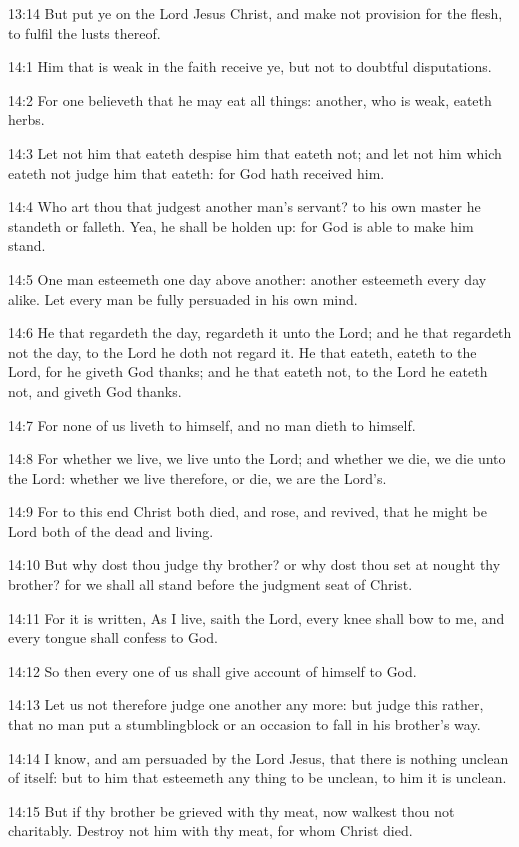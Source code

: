 13:14 But put ye on the Lord Jesus Christ, and make not provision for
the flesh, to fulfil the lusts thereof.

14:1 Him that is weak in the faith receive ye, but not to doubtful
disputations.

14:2 For one believeth that he may eat all things: another, who is
weak, eateth herbs.

14:3 Let not him that eateth despise him that eateth not; and let not
him which eateth not judge him that eateth: for God hath received him.

14:4 Who art thou that judgest another man's servant? to his own
master he standeth or falleth. Yea, he shall be holden up: for God is
able to make him stand.

14:5 One man esteemeth one day above another: another esteemeth every
day alike. Let every man be fully persuaded in his own mind.

14:6 He that regardeth the day, regardeth it unto the Lord; and he
that regardeth not the day, to the Lord he doth not regard it. He that
eateth, eateth to the Lord, for he giveth God thanks; and he that
eateth not, to the Lord he eateth not, and giveth God thanks.

14:7 For none of us liveth to himself, and no man dieth to himself.

14:8 For whether we live, we live unto the Lord; and whether we die,
we die unto the Lord: whether we live therefore, or die, we are the
Lord's.

14:9 For to this end Christ both died, and rose, and revived, that he
might be Lord both of the dead and living.

14:10 But why dost thou judge thy brother? or why dost thou set at
nought thy brother? for we shall all stand before the judgment seat of
Christ.

14:11 For it is written, As I live, saith the Lord, every knee shall
bow to me, and every tongue shall confess to God.

14:12 So then every one of us shall give account of himself to God.

14:13 Let us not therefore judge one another any more: but judge this
rather, that no man put a stumblingblock or an occasion to fall in his
brother's way.

14:14 I know, and am persuaded by the Lord Jesus, that there is
nothing unclean of itself: but to him that esteemeth any thing to be
unclean, to him it is unclean.

14:15 But if thy brother be grieved with thy meat, now walkest thou
not charitably. Destroy not him with thy meat, for whom Christ died.

